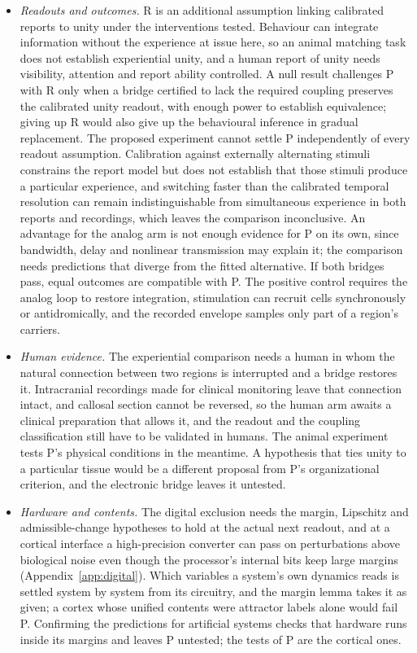 \documentclass[12pt]{article}
\begin{document}
\begin{itemize}
\item \emph{Readouts and outcomes.} R is an additional assumption linking
calibrated reports to unity under the interventions tested. Behaviour can
integrate information without the experience at issue here, so an animal
matching task does not establish experiential unity, and a human report of
unity needs visibility, attention and report ability controlled. A null result
challenges P with R only when a bridge certified to lack the required coupling
preserves the calibrated unity readout, with enough power to establish
equivalence; giving up R would also give up the behavioural inference in
gradual replacement. The proposed experiment cannot settle P independently of
every readout assumption. Calibration against externally alternating stimuli
constrains the report model but does not establish that those stimuli produce a
particular experience, and switching faster than the calibrated temporal
resolution can remain indistinguishable from simultaneous experience in both
reports and recordings, which leaves the comparison inconclusive. An advantage
for the analog arm is not enough evidence for P on its own, since bandwidth,
delay and nonlinear transmission may explain it; the comparison needs
predictions that diverge from the fitted alternative. If both bridges pass,
equal outcomes are compatible with P. The positive control requires the analog
loop to restore integration, stimulation can recruit cells synchronously or
antidromically, and the recorded envelope samples only part of a region's
carriers.

\item \emph{Human evidence.} The experiential comparison needs a human in
whom the natural connection between two regions is interrupted and a bridge
restores it. Intracranial recordings made for clinical monitoring leave that
connection intact, and callosal section cannot be reversed, so the human arm
awaits a clinical preparation that allows it, and the readout and the coupling
classification still have to be validated in humans. The animal experiment
tests P's physical conditions in the meantime. A hypothesis that ties unity to
a particular tissue would be a different proposal from P's organizational
criterion, and the electronic bridge leaves it untested.

\item \emph{Hardware and contents.} The digital exclusion needs the margin,
Lipschitz and admissible-change hypotheses to hold at the actual next readout,
and at a cortical interface a high-precision converter can pass on
perturbations above biological noise even though the processor's internal bits
keep large margins (Appendix~\ref{app:digital}). Which variables a system's own
dynamics reads is settled system by system from its circuitry, and the margin
lemma takes it as given; a cortex whose unified contents were attractor labels
alone would fail P. Confirming the predictions for artificial systems checks
that hardware runs inside its margins and leaves P untested; the tests of P are
the cortical ones.


\end{itemize}
\end{document}

